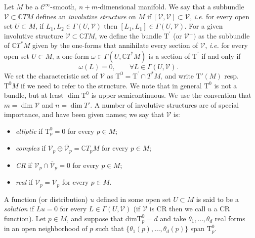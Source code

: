 \documentclass[11pt]{amsart}
\newcommand{\holforms}{\mathrm{T}'}
\newcommand{\charforms}{\mathrm{T}^0}
\theoremstyle{definition}
\theoremstyle{remark}
\theoremstyle{plain}
\begin{document}
Let $M$ be a $\mathcal{C}^\infty$-smooth, $n+m$-dimensional
manifold. We say that a subbundle
$\mathcal{V} \subset \mathbb{C} TM$ defines an \emph{involutive
  structure} on $M$ if
$[\mathcal{V},\mathcal{V}] \subset \mathcal{V}$, \textit{i.e.} for
every open set $U \subset M$, if
$L_1,L_2 \in \Gamma(U, \mathcal{V})$ then
$[L_1, L_1] \in \Gamma(U, \mathcal{V})$. For a given involutive
structure $\mathcal{V} \subset \mathbb{C}T M$, we define the
bundle $\mathrm{T}^\prime$ (or $\mathcal{V}^\perp)$ as the subbundle
of $\mathbb{C}T^\ast M$ given by the one-forms that annihilate
every section of $\mathcal{V}$, \textit{i.e.} for every open set
$U \subset M$, a one-form
$\omega \in \Gamma(U, \mathbb{C} T^\ast M)$ is a section of
$\mathrm{T}^\prime$ if and only if
%
\begin{equation*}
  \omega(L) = 0, \qquad \forall L \in \Gamma(U, \mathcal{V}).
\end{equation*}
%
We set the characteristic set of $\mathcal{V}$ as
$\mathrm{T}^0 = \mathrm{T}^\prime \cap T^\ast M$, and write $\holforms(M)$
resp. $\charforms{M}$ if we need to refer to the structure. We note that in
general $\mathrm{T}^0$ is not a bundle, but at least
$\dim \mathrm{T}^0$ is upper semicontinuous. We use the convention
that $m=\dim \mathcal{V}$ and $n= \dim T'$. A number of involutive
structures are of special importance, and have been given names; we
say that $\mathcal{V}$ is:
%
\begin{itemize}
\item \emph{elliptic} if $\mathrm{T}^0_p = 0$ for every
  $p \in M$;
\item \emph{complex} if
  $\mathcal{V}_p \oplus \overline{\mathcal{V}}_p =
  \mathbb{C}T_pM$ for every $p \in M$;
\item \emph{CR} if $\mathcal{V}_p \cap \overline{\mathcal{V}}_p = 0$
  for every $p \in M$;
\item \emph{real} if $\mathcal{V}_p =\overline{\mathcal{V}}_p$ for
  every $p \in M$.
\end{itemize}
%
A function (or distribution) $u$ defined in some open set
$U \subset M$ is said to be a \emph{solution} if $Lu = 0$ for
every $L \in \Gamma(U,\mathcal{V})$ (if $\mathcal{V}$ is CR then we
call $u$ a CR function). Let $p \in M$, and suppose that
$\mathrm{dim} \mathrm{T}^0_p = d$ and take $\theta_1, \dots, \theta_d$ real forms in an open neighborhood of $p$ such that $\{ \theta_1 (p), \dots, \theta_d (p)\}$ span $\mathrm{T}^0_p$.
\end{document}

